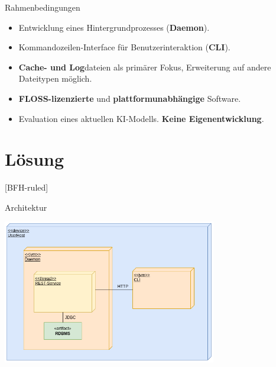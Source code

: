 \documentclass[
    ngerman,%
    authorontitle=true,
]{bfhbeamer}
\begin{document}
    \begin{frame}{Rahmenbedingungen}
        \begin{itemize}
            \item Entwicklung eines Hintergrundprozesses (\textbf{Daemon}).
            \item Kommandozeilen-Interface f\"ur Benutzerinteraktion (\textbf{CLI}).
            \item \textbf{Cache- und Log}dateien als prim\"arer Fokus, Erweiterung auf andere Dateitypen m\"oglich.
            \item \textbf{FLOSS-lizenzierte} und \textbf{plattformunabh\"angige} Software.
            \item Evaluation eines aktuellen KI-Modells. \textbf{Keine Eigenentwicklung}.
        \end{itemize}
    \end{frame}


    \section{Lösung}\label{sec:loesung}
    [BFH-ruled]
    \frame{\sectionpage}

    \begin{frame}{Architektur}
        \begin{center}
            \includegraphics[width=0.7\textwidth]{assets/DeplDiagram} %
        \end{center}
    \end{frame}
\end{document}
